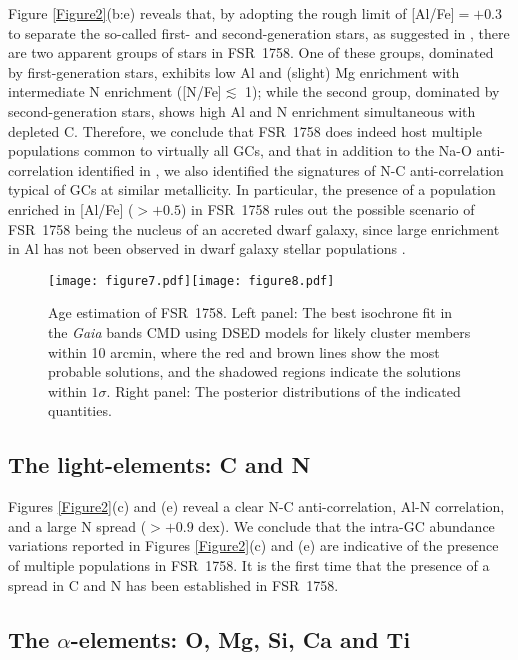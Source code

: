 \documentclass[longauth]{aa} %
\begin{document}
Figure \ref{Figure2}(b:e) reveals that, by adopting the rough limit of [Al/Fe]$=+0.3$ to separate the so-called first- and second-generation stars, as suggested in \citet[][]{Meszaros2020, Meszaros2021}, there are two apparent groups of stars in FSR~1758. One of these groups, dominated by first-generation stars, exhibits low Al and (slight) Mg enrichment with intermediate N enrichment ([N/Fe]$\lesssim$ 1); while the second group, dominated by second-generation stars, shows high Al and N enrichment simultaneous with depleted C. Therefore, we conclude that FSR~1758 does indeed host multiple populations common to virtually all GCs, and that in addition to the Na-O anti-correlation identified in \citet{Villanova2019}, we also identified the signatures of N-C anti-correlation typical of GCs at similar metallicity. In particular, the presence of a population enriched in [Al/Fe] ($>+0.5$) in FSR~1758 rules out the possible scenario of FSR~1758 being the nucleus of an accreted dwarf galaxy, since large enrichment in Al has not been observed in dwarf galaxy stellar populations \citep[see, e.g.,][]{Shetrone2003, Hasselquist2017, Hasselquist2019}.

\begin{figure*}
	\begin{center}
		\texttt{[image: figure7.pdf]}\texttt{[image: figure8.pdf]}
		\caption{Age estimation of FSR~1758. Left panel: The best isochrone fit in the \textit{Gaia} bands CMD using DSED models for likely cluster members within 10 arcmin, where the red and brown lines show the most probable solutions, and the shadowed regions indicate the solutions within $1\sigma$. Right panel: The posterior distributions of the indicated quantities.}
		\label{Figure4}
	\end{center}
\end{figure*}

\subsection{The light-elements: C and N}

Figures \ref{Figure2}(c) and (e) reveal a clear N-C anti-correlation, Al-N correlation, and a large N spread ($>+0.9$ dex). We conclude that the intra-GC abundance variations reported in  Figures \ref{Figure2}(c) and (e) are indicative of the presence of multiple populations in FSR~1758. It is the first time that the presence of a spread in C and N has been established in FSR~1758.

\subsection{The $\alpha$-elements: O, Mg, Si, Ca and Ti}
\end{document}
